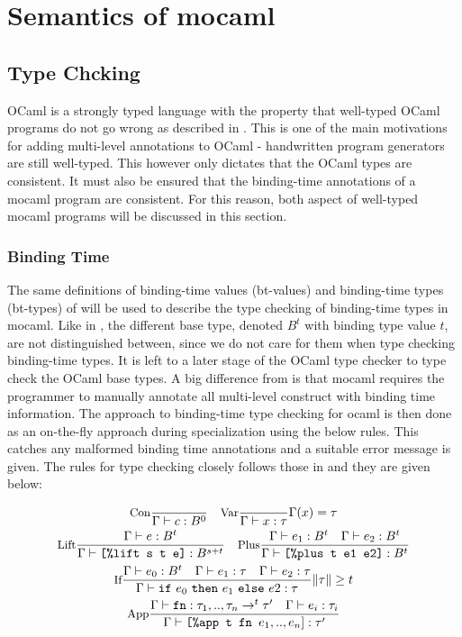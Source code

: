 
\section{Semantics of mocaml}

\subsection{Type Chcking}

OCaml is a strongly typed language with the property that well-typed OCaml programs do not go wrong as described in \cite{MilnerRobin1978Atot}. This is one of the main motivations for adding multi-level annotations to OCaml - handwritten program generators are still well-typed. This however only dictates that the OCaml types are consistent. It must also be ensured that the binding-time annotations of a mocaml program are consistent. For this reason, both aspect of well-typed mocaml programs will be discussed in this section.

\subsubsection{Binding Time}

The same definitions of binding-time values (bt-values) and binding-time types (bt-types) of \cite{multilevel} will be used to describe the type checking of binding-time types in mocaml. Like in \cite{multilevel}, the different base type, denoted $B^t$ with binding type value $t$, are not distinguished between, since we do not care for them when type checking binding-time types. It is left to a later stage of the OCaml type checker to type check the OCaml base types.
A big difference from \cite{multilevel} is that mocaml requires the programmer to manually annotate all multi-level construct with binding time information. The approach to binding-time type checking for ocaml is then done as an on-the-fly approach during specialization using the below rules. This catches any malformed binding time annotations and a suitable error message is given. The rules for type checking closely follows those in \cite{multilevel} and they are given below:

\begin{gather*}
  \text{\small Con} \dfrac{}{\Gamma \vdash c : B^0} \quad
  \text{\small Var} \dfrac{}{\Gamma \vdash x : \tau}\Gamma(x)=\tau\\
  \text{\small Lift} \dfrac{
    \Gamma \vdash e : B^t
  }{
    \Gamma \vdash \text{\texttt{[\%lift s t e]}} : B^{s+t}
  }
  \quad
  \text{\small Plus} \dfrac{
    \Gamma \vdash e_1 : B^t \quad
    \Gamma \vdash e_2 : B^t
  }{
    \Gamma \vdash \text{\texttt{[\%plus t e1 e2]}} : B^t
  }
  \\  
  \text{\small If} \dfrac{
    \Gamma \vdash e_0 : B^t \quad
    \Gamma \vdash e_1 : \tau \quad
    \Gamma \vdash e_2 : \tau
  }{\Gamma \vdash \mathtt{if}~e_0~\mathtt{then}~e_1~\mathtt{else}~e2 : \tau
  }\|\tau\| \ge t
  \\
  \text{\small App} \dfrac{
    \Gamma \vdash \mathtt{fn} : \tau_1,..,\tau_n \rightarrow ^t \tau' \quad
    \Gamma \vdash e_i : \tau_i
  }{
    \Gamma \vdash \text{\texttt{[\%app t fn }}e_1,..,e_n] : \tau'
  }
\end{gather*}


